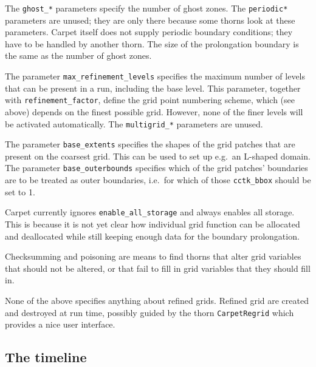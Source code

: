 \documentclass{article}
\begin{document}
   The \texttt{ghost\_*} parameters specify the number of ghost zones.
   The \texttt{periodic*} parameters are unused; they are only there
   because some thorns look at these parameters.  Carpet itself does
   not supply periodic boundary conditions; they have to be handled by
   another thorn.  The size of the prolongation boundary is the same
   as the number of ghost zones.

   The parameter \texttt{max\_refinement\_levels} specifies the
   maximum number of levels that can be present in a run, including
   the base level.  This parameter, together with
   \texttt{refinement\_factor}, define the grid point numbering
   scheme, which (see above) depends on the finest possible grid.
   However, none of the finer levels will be activated automatically.
   The \texttt{multigrid\_*} parameters are unused.

   The parameter \texttt{base\_extents} specifies the shapes of the
   grid patches that are present on the coarsest grid.  This can be
   used to set up e.g.\ an L-shaped domain.  The parameter
   \texttt{base\_outerbounds} specifies which of the grid patches'
   boundaries are to be treated as outer boundaries, i.e.\ for which
   of those \texttt{cctk\_bbox} should be set to 1.

   Carpet currently ignores \texttt{enable\_all\_storage} and always
   enables all storage.  This is because it is not yet clear how
   individual grid function can be allocated and deallocated while
   still keeping enough data for the boundary prolongation.

   Checksumming and poisoning are means to find thorns that alter grid
   variables that should not be altered, or that fail to fill in grid
   variables that they should fill in.

   None of the above specifies anything about refined grids.  Refined
   grid are created and destroyed at run time, possibly guided by the
   thorn \texttt{CarpetRegrid} which provides a nice user interface.



\subsection{The timeline}
\end{document}
